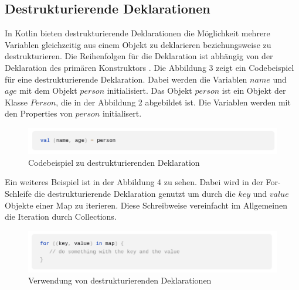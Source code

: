 \documentclass{article}
\begin{document}
\subsection{Destrukturierende Deklarationen}
In Kotlin bieten destrukturierende Deklarationen die Möglichkeit mehrere Variablen gleichzeitig aus einem Objekt zu deklarieren beziehungsweise zu destrukturieren. Die Reihenfolgen für die Deklaration ist abhängig von der Deklaration des primären Konstruktors \cite{KotlinLangDoc}. Die Abbildung 3 zeigt ein Codebeispiel für eine destrukturierende Deklaration. Dabei werden die Variablen $name$ und $age$ mit dem Objekt $person$ initialisiert. Das Objekt $person$ ist ein Objekt der Klasse $Person$, die in der Abbildung 2 abgebildet ist. Die Variablen werden mit den Properties von $person$ initialisert.
\begin{figure}[!htb]
    \centering
    \includegraphics[width=\linewidth]{img/DestrucDecl.png}
    \caption{Codebeispiel zu destrukturierenden Deklaration\footnotemark}
\end{figure}
\newline
Ein weiteres Beispiel ist in der Abbildung 4 zu sehen. Dabei wird in der For-Schleife die destrukturierende Deklaration genutzt um durch die $key$ und $value$ Objekte einer Map zu iterieren. Diese Schreibweise vereinfacht im Allgemeinen die Iteration durch Collections.
\begin{figure}[!htb]
    \centering
    \includegraphics[width=\linewidth]{img/DestrucDecl2.png}
    \caption{Verwendung von destrukturierenden Deklarationen \footnotemark}
\end{figure}
\end{document}

